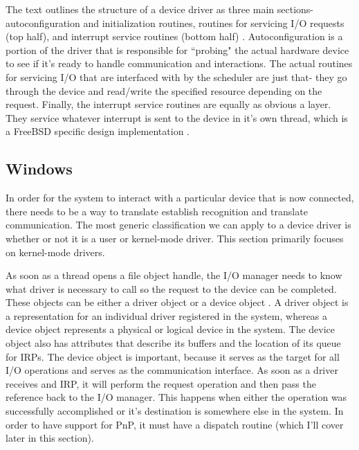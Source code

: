 \documentclass[10pt,draftclsnofoot,onecolumn]{IEEEtran}
\begin{document}
\par The text outlines the structure of a device driver as three main sections- autoconfiguration and initialization routines, routines for servicing I/O requests (top half), and interrupt service routines (bottom half) \cite{bsd:1}.
Autoconfiguration is a portion of the driver that is responsible for ``probing" the actual hardware device to see if it's ready to handle communication and interactions.
The actual routines for servicing I/O that are interfaced with by the scheduler are just that- they go through the device and read/write the specified resource depending on the request.
Finally, the interrupt service routines are equally as obvious a layer.
They service whatever interrupt is sent to the device in it's own thread, which is a FreeBSD specific design implementation \cite{bsd:1}.

\subsection{Windows}
\label{sub:Devices Windows}
\par In order for the system to interact with a particular device that is now connected, there needs to be a way to translate establish recognition and translate communication.
The most generic classification we can apply to a device driver is whether or not it is a user or kernel-mode driver.
This section primarily focuses on kernel-mode drivers.

\par As soon as a thread opens a file object handle, the I/O manager needs to know what driver is necessary to call so the request to the device can be completed.
These objects can be either a driver object or a device object \cite{win:2}.
A driver object is a representation for an individual driver registered in the system, whereas a device object represents a physical or logical device in the system.
The device object also has attributes that describe its buffers and the location of its queue for IRPs.
The device object is important, because it serves as the target for all I/O operations and serves as the communication interface.
As soon as a driver receives and IRP, it will perform the request operation and then pass the reference back to the I/O manager.
This happens when either the operation was successfully accomplished or it's destination is somewhere else in the system.
In order to have support for PnP, it must have a dispatch routine (which I'll cover later in this section).
\end{document}
